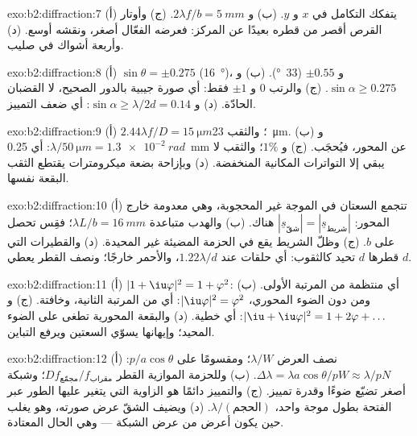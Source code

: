 \begin{solution}{exo:b2:diffraction:7}
(أ) يتفكك التكامل في $x$ و $y$. (ب) و $2\lambda f/b = \qty{5}{mm}$. (ج) وأوتار
القرص أقصر من قطره بعيدًا عن المركز: فعرضه
الفعّال أصغر، ونقشه أوسع. (د) وأربعة أشواك
 في صليب.
\end{solution}

\begin{solution}{exo:b2:diffraction:8}
(أ) $\sin\theta = \pm0.275$ (\qty{16}{\degree})، و $\pm0.55$ (\qty{33}{\degree}). (ب) و $\sin\alpha \ge 0.275$.
(ج) والرتب $0$ و $\pm1$ فقط: أي صورة جيبية بالدور الصحيح، لا
القضبان الحادّة. (د) و $\sin\alpha \ge \lambda/2d = 0.14$: أي ضعف التمييز.
\end{solution}

\begin{solution}{exo:b2:diffraction:9}
(أ) $2.44\lambda f/D = \qty{15}{\micro m}$؛ والثقب \qty{23}{\micro m}. (ب) و $\lambda/\qty{50}{\micro m} =
\qty{1.3e-2}{rad}$: أي \qty{0.25}{mm} عن المحور، فيُحجَب. (ج) و $1\%$؛ والثقب لا يبقي إلا
التواترات المكانية المنخفضة. (د) وبإزاحة بضعة ميكرومترات يقتطع
الثقب البقعة نفسها.
\end{solution}

\begin{solution}{exo:b2:diffraction:10}
(أ) تتجمع السعتان في الموجة غير المحجوبة، وهي معدومة خارج المحور:
$|\underline s_{\text{شقّ}}| = |\underline s_{\text{شريط}}|$ هناك. (ب) والهدب متباعدة $\lambda L/b =
\qty{16}{mm}$؛ فقِس  تحصل على $b$. (ج) وظلّ الشريط يقع
في الحزمة المضيئة غير المحيدة. (د) والقطيرات التي قطرها $d$ تحيد
كالثقوب: أي حلقات عند $1.22\lambda/d$، والأحمر خارجًا؛ ونصف القطر يعطي $d$.
\end{solution}

\begin{solution}{exo:b2:diffraction:11}
(أ) $|1 + \iu\varphi|^2 = 1 + \varphi^2$: أي منتظمة من المرتبة الأولى. (ب) ومن دون
الضوء المحوري، $|\iu\varphi|^2 = \varphi^2$: أي من المرتبة الثانية، وخافتة. (ج) و $|\iu + \iu\varphi|^2 =
1 + 2\varphi + \dots$: أي خطية. (د) والبقعة المحورية تطغى على الضوء
المحيد؛ وإيهانها يسوّي السعتين ويرفع التباين.
\end{solution}

\begin{solution}{exo:b2:diffraction:12}
(أ) نصف العرض $\lambda/W$؛ ومقسومًا على $p/a\cos\theta$: $\Delta\lambda = \lambda a\cos\theta/pW \approx
\lambda/pN$. (ب) وللحزمة الموازية القطر $Df_{\text{مجمّع}}/f_{\text{مقراب}}$؛
وشبكة أصغر تضيّع ضوءًا وقدرة تمييز. (ج) والتمييز
دائمًا هو الزاوية التي يتغير عليها الطور عبر
الفتحة بطول موجة واحد، $\lambda/(\text{الحجم})$. (د) ويضيف الشقّ عرض صورته،
وهو يغلب حين يكون أعرض من عرض 
الشبكة --- وهي الحال المعتادة.
\end{solution}

